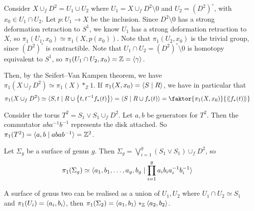 \begin{example}
	Consider \( X \cup_f D^2 = U_1 \cup U_2 \) where \( U_1 = X \cup_f D^2 \setminus \qty{0} \) and \( U_2 = (D^2)^\circ \), with \( x_0 \in U_1 \cap U_2 \).
	Let \( p \colon U_1 \to X \) be the inclusion.
	Since \( D^2 \setminus \qty{0} \) has a strong deformation retraction to \( S^1 \), we know \( U_1 \) has a strong deformation retraction to \( X \), so \( \pi_1(U_1,x_0) \simeq \pi_1(X,p(x_0)) \).
	Note that \( \pi_1(U_2,x_0) \) is the trivial group, since \( (D^2)^\circ \) is contractible.
	Note that \( U_1 \cap U_2 = (D^2)^\circ \setminus \qty{0} \) is homotopy equivalent to \( S^1 \), so \( \pi_1(U_1 \cap U_2,x_0) = \mathbb Z = \langle{} \gamma \rangle \).

	Then, by the Seifert--Van Kampen theorem, we have \( \pi_1(X \cup_f D^2) \simeq \pi_1(X) \ast_{\mathbb Z} 1 \).
	If \( \pi_1(X,x_0) = \langle{} S \mid R \rangle \), we have in particular that
	\[ \pi_1(X \cup_f D^2) \simeq \genset{S, t \mid R \cup \qty{t, t^{-1}f_\star(t)}} = \genset{S \mid R \cup{f_\star(t)}} = \faktor{\pi_1(X,x_0)}{\ngenset{f_\star(t)}} \]
\end{example}
\begin{example}
	Consider the torus \( T^2 = S_1 \vee S_1 \cup_f D^2 \).
	Let \( a, b \) be generators for \( T^2 \).
	Then the commutator \( aba^{-1}b^{-1} \) represents the disk attached.
	So \( \pi_1(T^2) = \langle{} a, b \mid abab^{-1} \rangle = \mathbb Z^2 \).
\end{example}
\begin{example}
	Let \( \Sigma_g \) be a surface of genus \( g \).
	Then \( \Sigma_g = \bigvee_{i=1}^g (S_1 \vee S_1) \cup_f D^2 \), so
	\[ \pi_1(\Sigma_g) \simeq \langle{} a_1,b_1,\dots, a_g, b_g \mid \prod_{i=1}^g a_i b_i a_i^{-1} b_i^{-1} \rangle \]
\end{example}
\begin{example}
	A surface of genus two can be realised as a union of \( U_1, U_2 \) where \( U_1 \cap U_2 \simeq S_1 \) and \( \pi_1(U_i) = \langle{} a_i,b_i \rangle \), then \( \pi_1(\Sigma_2) = \langle{} a_1,b_1 \rangle \ast_{\mathbb Z} \langle{} a_2,b_2 \rangle \).
\end{example}
